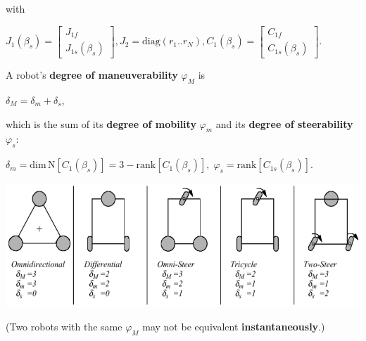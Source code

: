 \documentclass[landscape]{article}
\newcommand{\vmspace}{\vspace{-7pt}}
\newcommand{\vpspace}{\vspace{5pt}}
\begin{document}
\begin{multicols}{3}
\begin{minipage}{\columnwidth}
  with
  \vmspace
  \begin{center}
    $J_1(\beta_s)
    =
    \left[\begin{matrix}
      J_{1f} \\
      J_{1s}(\beta_s)
    \end{matrix}\right],
    J_2
    =
    \mathrm{diag}(r_1..r_N),
    C_1(\beta_s)
    =
    \left[\begin{matrix}
      C_{1f} \\
      C_{1s}(\beta_s)
    \end{matrix}\right].$
  \end{center}
\end{minipage}

\vpspace

\begin{minipage}{\columnwidth}
  A robot's \textbf{degree of maneuverability} $\varphi_M$ is
  \vmspace
  \begin{center}
    $\delta_M = \delta_m + \delta_s$,
  \end{center}
  \vmspace
  which is the sum of its \textbf{degree of mobility} $\varphi_m$ and its
  \textbf{degree of steerability} $\varphi_s$:
  \vmspace
  \begin{center}
    $\delta_m=\mathrm{dim}\,\mathrm{N}\left[C_1(\beta_s)\right] = 3 -
    \mathrm{rank}\left[C_1(\beta_s)\right],\;
    \varphi_s = \mathrm{rank}\left[C_{1s}(\beta_s)\right].$
  \end{center}
\end{minipage}

\includegraphics[width=\columnwidth]{img/3_WheelTypes.png}

\vmspace

(Two robots with the same $\varphi_M$ may not be equivalent
\textbf{instantaneously}.)




\end{multicols}
\end{document}
